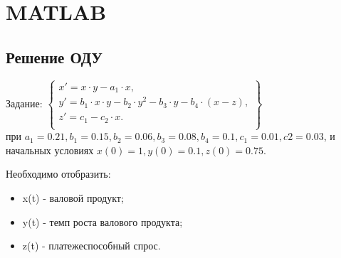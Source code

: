 \documentclass{article}
\begin{document}
\section{MATLAB}
\subsection{Решение ОДУ}
Задание:
\begin{math}
\left\{ 
\begin{array}{l}
  x' = x \cdot y - a_1 \cdot x, \\
  y' = b_1 \cdot x \cdot y - b_2  \cdot y^2 - b_3  \cdot y - b_4 \cdot (x-z),\\ 
  z' = c_1 -c_2  \cdot x.\\
\end{array}
\right\}
\end{math}\\
при $a_1 = 0.21, b_1=0.15, b_2 = 0.06, b_3 = 0.08, b_4 = 0.1, c_1 = 0.01,
c2=0.03$, и начальных условиях $x(0) = 1, y(0) = 0.1, z(0) = 0.75$.

Необходимо отобразить: 
\begin{itemize}
  \item x(t) - валовой продукт;
  \item y(t) - темп роста валового продукта;
  \item z(t) - платежеспособный спрос.
\end{itemize}
\end{document}
